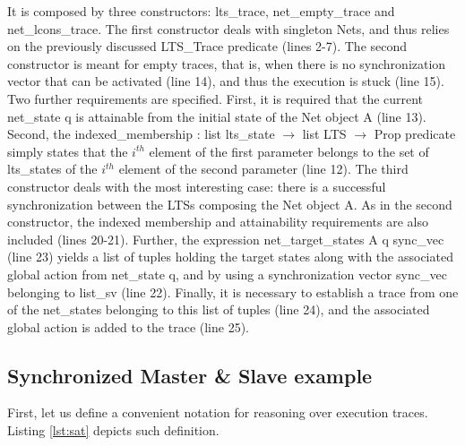 	\noindent It is composed by three constructors: \textsf{lts\_trace},
	\textsf{net\_empty\_trace} and \textsf{net\_lcons\_trace}.
	The first constructor deals with singleton \textsf{Net}s, and thus relies on
	the previously discussed \textsf{LTS\_Trace} predicate (lines 2-7).		
	The second constructor is meant for empty traces, that is, when there is no
	synchronization vector that can be activated (line 14), 
	and thus the execution is stuck (line 15). Two further requirements are specified.
	First, it is required that the current \textsf{net\_state} \textsf{q} is 
	attainable from the initial state of the \textsf{Net} object \textsf{A} (line 13). Second, 
	the 
	\textsf{indexed\_membership : list lts\_state $\rightarrow$ list LTS $\rightarrow$ Prop}
	predicate simply states that the $i^{th}$ element of the first parameter belongs to the set of \textsf{lts\_states} 
	of the $i^{th}$ element of the second parameter (line 12).
	The third constructor deals with the most interesting case: there is a successful synchronization
	between the \ac{LTS}s composing the \textsf{Net} object \textsf{A}. As in the second constructor,
	the indexed membership and attainability requirements are also included (lines 20-21). 
	Further, the expression
	\textsf{net\_target\_states A q sync\_vec} (line 23) yields a list of tuples holding the 
	target states along with the associated global \textsf{action} from 
	\textsf{net\_state} \textsf{q}, and by using 
	a synchronization vector \textsf{sync\_vec} belonging to \textsf{list\_sv} (line 22).
	Finally, it is necessary to establish 
	a trace from one of the \textsf{net\_state}s belonging	
	to this list of tuples (line 24), and the associated global action 
	is added to the trace (line 25).	
	
		
		
\subsection{Synchronized Master \& Slave example}	
\label{sub:masterslave}

	
		First, let us define a convenient notation for reasoning over execution traces.
	Listing \ref{lst:sat} depicts such definition.
	
						


